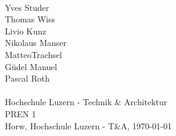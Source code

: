 \begin{titlepage}
    \begin{center}     
        \\
        \vspace*{1.2cm}
        Yves Studer\\
        Thomas Wiss\\
        Livio Kunz\\
        Nikolaus Manser\\
        MatteoTrachsel\\
        Güdel Manuel\\
        Pascal Roth\\
        \vspace*{1.2cm}
        {\Huge \myTitel}\\
        \vspace*{1cm}
        \vspace*{10cm}
        {\normalsize Hochschule Luzern - Technik \& Architektur}\\
        {\normalsize PREN 1}\\
        \vspace*{0.6cm}
        {\normalsize Horw, Hochschule Luzern - T\&A, \today}\\
    \end{center}
\end{titlepage}

